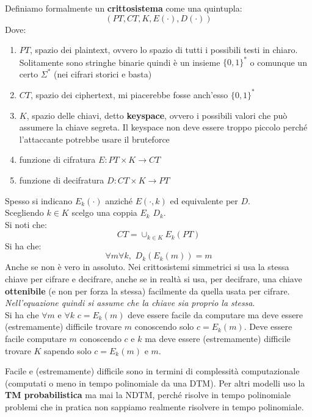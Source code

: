 \documentclass[a4paper,12pt, oneside]{book}
\begin{document}
\begin{definizione}
  Definiamo formalmente un \textbf{crittosistema} come una quintupla:
  \[(PT,CT,K, E(\cdot), D(\cdot))\]
  Dove:
  \begin{enumerate}
    \item $PT$, spazio dei plaintext, ovvero lo spazio di tutti i possibili
    testi in chiaro. Solitamente sono stringhe binarie quindi è un insieme
    $\{0,1\}^*$ o comunque un certo $\Sigma^*$ (nei cifrari storici e basta)
    \item $CT$, spazio dei ciphertext, mi piacerebbe fosse anch'esso $\{0,1\}^*$
    \item $K$, spazio delle chiavi, detto \textbf{keyspace}, ovvero i possibili
    valori che può assumere la chiave segreta. Il keyspace non deve essere
    troppo piccolo perché l'attaccante potrebbe usare il bruteforce
    \item funzione di cifratura $E:PT\times K\to CT$
    \item funzione di decifratura $D:CT\times K\to PT$
  \end{enumerate}
  Spesso si indicano $E_k(\cdot)$ anziché $E(\cdot, k)$ ed equivalente per
  $D$.\\
  Scegliendo $k\in K$ scelgo una coppia $E_k$ $D_k$. \\
  Si noti che:
  \[CT=\cup_{k\in K}E_k(PT)\]
  Si ha che:
  \[\forall m\forall k,\,\,D_k(E_k(m))=m\]
  Anche se non è vero in assoluto. Nei crittosistemi simmetrici si
  usa la stessa chiave per cifrare e decifrare, anche se in realtà si usa, per
  decifrare, una chiave \textbf{ottenibile} (e non per forza la stessa)
  facilmente da quella usata per 
  cifrare. \emph{Nell'equazione quindi si assume che la chiave sia proprio la
  stessa}.\\  
  Si ha che $\forall m$ e $\forall k$ $c=E_k(m)$ deve essere facile da computare
  ma deve essere (estremamente)
  difficile trovare $m$ conoscendo solo $c=E_k(m)$. Deve essere facile computare
  $m$ conoscendo $c$ e $k$ ma deve essere (estremamente) difficile trovare $K$
  sapendo solo $c=E_k(m)$ e $m$.
\end{definizione}
\begin{shaded}
  Facile e (estremamente) difficile sono in termini di complessità
  computazionale (computati o meno in tempo polinomiale da una DTM). Per altri
  modelli uso la \textbf{TM probabilistica} ma mai la NDTM, perché risolve in
  tempo polinomiale problemi che in pratica non sappiamo realmente risolvere in
  tempo polinomiale. 
\end{shaded}
\end{document}
